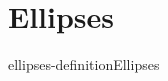 \documentclass[preview]{standalone}
\begin{document}
\genpage

\section{Ellipses}

\begin{snippetdefinition}{ellipses-definition}{Ellipses}
    \todo
\end{snippetdefinition}
\end{document}

